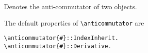 
Denotes the anti-commutator of two objects.

The default properties of \verb|\anticommutator| are
\begin{verbatim}
\anticommutator{#}::IndexInherit.
\anticommutator{#}::Derivative.
\end{verbatim}




